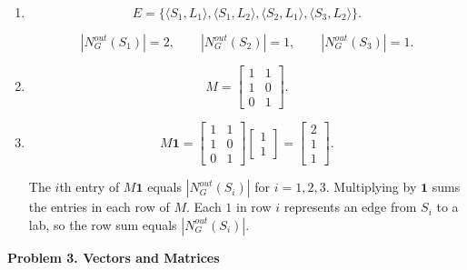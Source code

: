 \documentclass[12pt]{article}
\begin{document}
\begin{enumerate}
    \item[(a)]
    \[
    E=
    \{
    \langle S_1,L_1\rangle,
    \langle S_1,L_2\rangle,
    \langle S_2,L_1\rangle,
    \langle S_3,L_2\rangle
    \}.
    \]
    
    \[
    |N_G^{out}(S_1)|=2,\qquad
    |N_G^{out}(S_2)|=1,\qquad
    |N_G^{out}(S_3)|=1.
    \]
    
    \item[(b)]
    \[
    M=
    \begin{bmatrix}
    1 & 1\\
    1 & 0\\
    0 & 1
    \end{bmatrix}.
    \]
    
    \item[(c)]
    \[
    M\mathbf{1}
    =
    \begin{bmatrix}
    1 & 1\\
    1 & 0\\
    0 & 1
    \end{bmatrix}
    \begin{bmatrix}
    1\\
    1
    \end{bmatrix}
    =
    \begin{bmatrix}
    2\\
    1\\
    1
    \end{bmatrix}.
    \]
    
    The $i$th entry of $M\mathbf{1}$ equals
    $|N_G^{out}(S_i)|$ for $i=1,2,3$.
    Multiplying by $\mathbf{1}$ sums the entries in each row of $M$.
    Each $1$ in row $i$ represents an edge from $S_i$ to a lab,
    so the row sum equals $|N_G^{out}(S_i)|$.
\end{enumerate}

\textbf{Problem 3. Vectors and Matrices}
\end{document}
